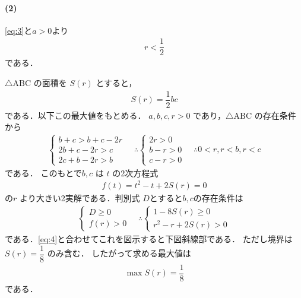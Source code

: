 \documentclass[../../main.tex]{subfiles}
\begin{document}
\paragraph{(2)}

\cref{eq:3}と$a>0$より
\begin{align}
  r < \dfrac{1}{2} \label{eq:4}
\end{align}
である．

$\triangle \text{ABC}$ の面積を $S(r)$ とすると，
\begin{align}
  S(r) = \dfrac{1}{2}bc \label{eq:5}
\end{align}
である．以下この最大値をもとめる．
$a, b, c, r > 0$ であり，$\triangle \text{ABC}$ の存在条件から
\begin{align}
  \begin{cases}
    b+c > b+c-2r \\
    2b+c-2r > c \\
    2c+b-2r > b
  \end{cases}
  \quad \therefore
  \begin{cases}
    2r > 0 \\
    b-r > 0 \\
    c-r > 0
  \end{cases}
  \quad \therefore
  0<r, r<b, r<c \label{eq:6}
\end{align}
である．
このもとで$b, c$ は $t$ の2次方程式
\begin{align}
  f(t) = t^2 - t + 2S(r) = 0
\end{align}
の$r$ より大きい2実解である．判別式 $D$とすると$b,c$の存在条件は
\begin{align}
  \begin{cases}
    D \ge 0 \\
    f(r) > 0
  \end{cases}
  \quad \therefore
  \begin{cases}
    1 - 8S(r) \ge 0 \\
    r^2 - r + 2S(r) > 0
  \end{cases}
\end{align}
である．\cref{eq:4}と合わせてこれを図示すると下図斜線部である．
ただし境界は $S(r) = \dfrac{1}{8}$ のみ含む．
したがって求める最大値は
\begin{align}
  \max S(r) =  \dfrac{1}{8}
\end{align}
である．
\end{document}
